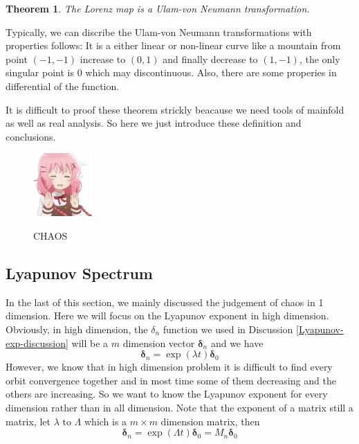 \documentclass[12pt]{article}
\theoremstyle{plain}
\newtheorem{theorem}{\textbf{Theorem}}[section]
\begin{document}
\begin{theorem} The Lorenz map is a Ulam-von Neumann transformation.
\end{theorem}

Typically, we can discribe the Ulam-von Neumann transformations with properties follows: It is a either linear or non-linear curve like a mountain from point $(-1, -1)$ increase to $(0, 1)$ and finally decrease to $(1, -1)$, the only singular point is $0$ which may discontinuous. Also, there are some properies in differential of the function.

It is difficult to proof these theorem strickly beacause we need tools of mainfold as well as real analysis. So here we just introduce these definition and conclusions.


\begin{figure}[H]
\begin{center}
\includegraphics[width=0.2\textwidth]{figure/CHAOS_1.png} \\
\caption{CHAOS}
\end{center}
\end{figure}



\newpage
\subsection{Lyapunov Spectrum}
In the last of this section, we mainly discussed the judgement of chaos in 1 dimension. Here we will focus on the Lyapunov exponent in high dimension. Obviously, in high dimension, the $\delta_n$ function we used in Discussion \ref{Lyapunov-exp-discussion} will be a $m$ dimension vector $\mathbf \delta_n$ and we have
$$
\mathbf \delta_n = \exp(\lambda t)\mathbf\delta_0
$$
However, we know that in high dimension problem it is difficult to find every orbit convergence together and in most time some of them decreasing and the others are increasing. So we want to know the Lyapunov exponent for every dimension rather than in all dimension. Note that the exponent of a matrix still a matrix, let $\lambda$ to $\Lambda$ which is a $m\times m$ dimension matrix, then
$$
\mathbf \delta_n = \exp(\Lambda t)\mathbf\delta_0 =  M_n \mathbf\delta_0
$$
\end{document}
